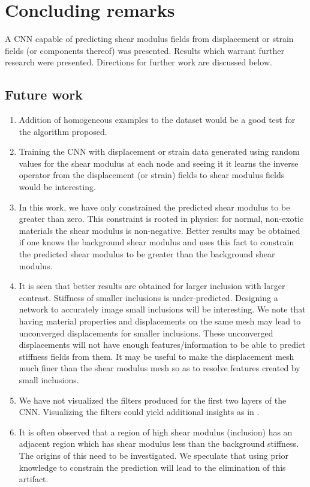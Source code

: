 \documentclass[12pt]{article}
\begin{document}
\section{Concluding remarks}
A CNN capable of predicting shear modulus fields from displacement or strain fields (or components thereof) was presented. Results which warrant further research were presented. Directions for further work are discussed below. 
\subsection{Future work}
\begin{enumerate}
\item{Addition of homogeneous examples to the dataset would be a good test for the algorithm proposed.}
\item{Training the CNN with displacement or strain data generated using random values for the shear modulus at each node and seeing it it learns the inverse operator from the displacement (or strain) fields to shear modulus fields would be interesting. }
\item{In this work, we have only constrained the predicted shear modulus to be greater than zero. This constraint is rooted in physics: for normal, non-exotic materials the shear modulus is non-negative. Better results may be obtained if one knows the background shear modulus and uses this fact to constrain the predicted shear modulus to be greater than the background shear modulus.}
\item{It is seen that better results are obtained for larger inclusion with larger contrast. Stiffness of smaller inclusions is under-predicted. Designing a network to accurately image small inclusions will be interesting. We note that having material properties and displacements on the same mesh may lead to unconverged displacements for smaller inclusions. These unconverged displacements will not have enough features/information to be able to predict stiffness fields from them. It may be useful to make the displacement mesh much finer than the shear modulus mesh so as to resolve features created by small inclusions.}
\item{We have not visualized the filters produced for the first two layers of the CNN. Visualizing the filters could yield additional insights as in \cite{paper:pateloberai2019}.}
\item{It is often observed that a region of high shear modulus (inclusion) has an adjacent region which has shear modulus less than the background stiffness. The origins of this need to be investigated. We speculate that using prior knowledge to constrain the prediction will lead to the elimination of this artifact.}

\end{enumerate}
\end{document}
